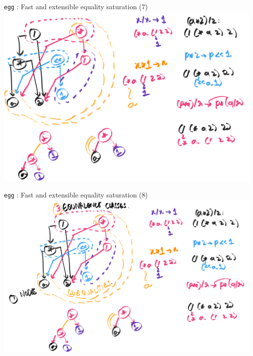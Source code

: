 \documentclass[8pt]{beamer}
\newcommand{\egg}{\texttt{egg} }
\begin{document}
\begin{frame}[fragile]{\egg: Fast and extensible equality saturation (7)}
\includegraphics[width=\textwidth]{./eg-1-7.png}
\end{frame}


\begin{frame}[fragile]{\egg: Fast and extensible equality saturation (8)}
\includegraphics[width=\textwidth]{./eg-1-8.png}
\end{frame}
\end{document}
